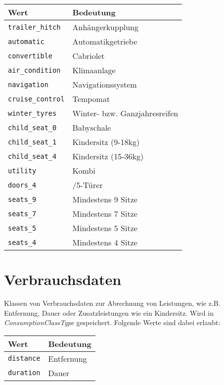 \begin{flushleft}
\begin{tabularx}{\linewidth}{l>{\raggedright\arraybackslash}X} 
\toprule
Wert & Bedeutung\\
\midrule
\verb|trailer_hitch| & Anhängerkupplung\\
\verb|automatic| & Automatikgetriebe\\
\verb|convertible| & Cabriolet\\
\verb|air_condition| & Klimaanlage\\
\verb|navigation| & Navigationssystem\\
\verb|cruise_control| & Tempomat\\
\verb|winter_tyres| & Winter- bzw. Ganzjahresreifen\\
\verb|child_seat_0| & Babyschale\\
\verb|child_seat_1| & Kindersitz (9-18kg)\\
\verb|child_seat_4| & Kindersitz (15-36kg)\\
\verb|utility| & Kombi\\
\verb|doors_4| & 4/5-Türer\\
\verb|seats_9| & Mindestens 9 Sitze\\
\verb|seats_7| & Mindestens 7 Sitze\\
\verb|seats_5| & Mindestens 5 Sitze\\
\verb|seats_4| & Mindestens 4 Sitze\\
\bottomrule
\end{tabularx}
\end{flushleft}

\section{Verbrauchsdaten}
\label{sec:CodeTabellen:AttributeClass}
Klassen von Verbrauchsdaten zur Abrechnung von Leistungen, wie z.B. Entfernung, Dauer oder Zusatzleistungen wie ein Kindersitz. Wird in  \emph{ConsumptionClassType} gespeichert. Folgende Werte sind dabei erlaubt:

\begin{flushleft}
\begin{tabularx}{\linewidth}{l>{\raggedright\arraybackslash}X} 
\toprule
Wert & Bedeutung\\
\midrule
\verb|distance| & Entfernung\\
\verb|duration| & Dauer\\
\bottomrule
\end{tabularx}
\end{flushleft}

